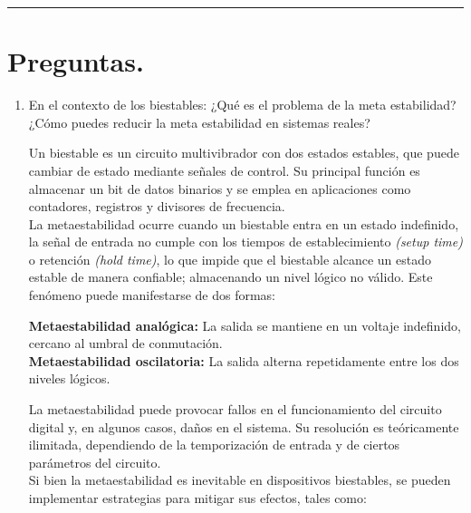 \documentclass[12pt,letterpaper]{article}
\begin{document}
\bigskip
\hrule height 0.1pt
\bigskip

\section*{Preguntas.}

\begin{enumerate}
\item En el contexto de los biestables: ¿Qué es el problema de la meta estabilidad? ¿Cómo puedes reducir la meta estabilidad en sistemas reales?
  \bigskip
  
  Un biestable es un circuito multivibrador con dos estados estables, que puede cambiar de estado mediante señales de control. Su principal función es almacenar un bit de datos binarios y se emplea en aplicaciones como contadores, registros y divisores de frecuencia.\\
  La metaestabilidad ocurre cuando un biestable entra en un estado indefinido, la señal de entrada no cumple con los tiempos de establecimiento \textit{(setup time)} o retención \textit{(hold time)}, lo que impide que el biestable alcance un estado estable de manera confiable; almacenando un nivel lógico no válido. Este fenómeno puede manifestarse de dos formas:
  
  \textbf{Metaestabilidad analógica:} La salida se mantiene en un voltaje indefinido, cercano al umbral de conmutación.\\
  \textbf{Metaestabilidad oscilatoria:} La salida alterna repetidamente entre los dos niveles lógicos.
  
  La metaestabilidad puede provocar fallos en el funcionamiento del circuito digital y, en algunos casos, daños en el sistema. Su resolución es teóricamente ilimitada, dependiendo de la temporización de entrada y de ciertos parámetros del circuito.\\
  Si bien la metaestabilidad es inevitable en dispositivos biestables, se pueden implementar estrategias para mitigar sus efectos, tales como:


\end{enumerate}
\end{document}
